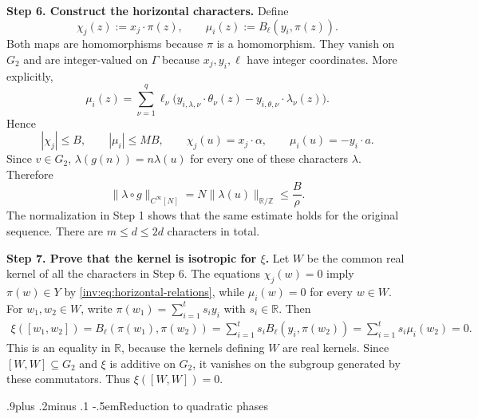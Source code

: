 \documentclass[twoside]{aomart}
\makeatletter
\theoremstyle{paperplain}
\theoremstyle{paperdefinition}
\renewcommand\subsection{\@startsection{subsection}{2}{\z@}
  {.9\baselineskip plus .2\baselineskip minus .1\baselineskip}
  {-.5em}{\normalfont\bfseries}}
\renewenvironment{proof}[1][\proofname]{\par\pushQED{\qed}%
  \normalfont\topsep6\p@\@plus3\p@\relax\trivlist
  \item[\hskip\labelsep\itshape #1\@addpunct{.}]\ignorespaces
}{\popQED\endtrivlist\@endpefalse}
\numberwithin{equation}{section}
\makeatother
\begin{document}
\begin{proof}
\par
\medskip
\noindent\textbf{Step 6. Construct the horizontal characters.}
Define
\begin{equation*}
 \chi_j(z):=x_j\cdot\pi(z),\qquad
 \mu_i(z):=B_\ell(y_i,\pi(z)).
\end{equation*}
Both maps are homomorphisms because $\pi$ is a homomorphism.
They vanish on $G_2$ and are integer-valued on $\Gamma$ because
$x_j,y_i,\ell$ have integer coordinates. More explicitly,
\begin{equation*}
 \mu_i(z)
 =\sum_{\nu=1}^{q}\ell_\nu
 \bigl(y_{i,\lambda,\nu}\cdot\theta_\nu(z)
       -y_{i,\theta,\nu}\cdot\lambda_\nu(z)\bigr).
\end{equation*}
Hence
\begin{equation*}
 |\chi_j|\le B,\qquad |\mu_i|\le MB,\qquad
 \chi_j(u)=x_j\cdot\alpha,\qquad
 \mu_i(u)=-y_i\cdot a.
\end{equation*}
Since $v\in G_2$, $\lambda(g(n))=n\lambda(u)$ for every one of these
characters $\lambda$. Therefore
\begin{equation*}
 \|\lambda\circ g\|_{C^\infty[N]}
 =N\|\lambda(u)\|_{\mathbb R/\mathbb Z}
 \le \frac{B}{\rho}.
\end{equation*}
The normalization in Step 1 shows that the same estimate holds for
the original sequence. There are $m\le d\le2d$ characters in total.

\par
\medskip
\noindent\textbf{Step 7. Prove that the kernel is isotropic for $\xi$.}
Let $W$ be the common real kernel of all the characters in Step 6.
The equations $\chi_j(w)=0$ imply
$\pi(w)\in Y$ by \eqref{inv:eq:horizontal-relations}, while $\mu_i(w)=0$ for every $w\in W$.
For $w_1,w_2\in W$, write
$\pi(w_1)=\sum_{i=1}^{t}s_i y_i$ with $s_i\in\mathbb R$. Then
\begin{equation*}
 \begin{aligned}
 \xi([w_1,w_2])
 =B_\ell(\pi(w_1),\pi(w_2))
 =\sum_{i=1}^{t}s_i B_\ell(y_i,\pi(w_2))
 =\sum_{i=1}^{t}s_i\mu_i(w_2)=0.
 \end{aligned}
\end{equation*}
This is an equality in $\mathbb R$, because the kernels defining $W$
are real kernels. Since $[W,W]\subseteq G_2$ and $\xi$ is additive on
$G_2$, it vanishes on the subgroup generated by these commutators.
Thus $\xi([W,W])=0$.
\end{proof}

\subsection{Reduction to quadratic phases}
\end{document}
